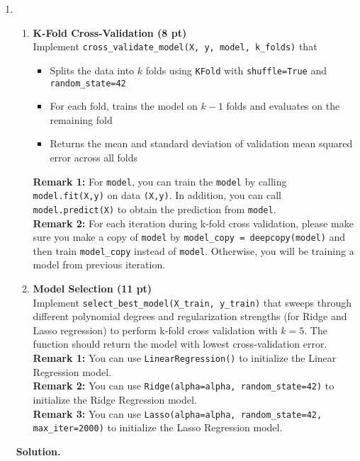 \documentclass{article}
\theoremstyle{definition}
\theoremstyle{remark}
\newenvironment{Q}
    {%
      \clearpage
      \item
    }
    {%
      \phantom{s}
      \bigskip
      \textbf{Solution.}
    }
\begin{document}
\begin{enumerate}[font={\Large\bfseries},left=0pt]
\begin{Q}
		\begin{enumerate}
			\item \textbf{K-Fold Cross-Validation (8 pt)}\\
			      Implement \texttt{cross\_validate\_model(X, y, model, k\_folds)} that
			      \begin{itemize}
				      \item Splits the data into $k$ folds using \texttt{KFold} with \texttt{shuffle=True} and \texttt{random\_state=42}
				      \item For each fold, trains the model on $k-1$ folds and evaluates on the remaining fold
				      \item Returns the mean and standard deviation of validation mean squared error across all folds
			      \end{itemize}
			      \textbf{Remark 1:} For \texttt{model}, you can train the \texttt{model} by calling \texttt{model.fit(X,y)} on data \texttt{(X,y)}. In addition, you can call \texttt{model.predict(X)} to obtain the prediction from \texttt{model}. \\
			      \textbf{Remark 2:} For each iteration during k-fold cross validation, please make sure you make a copy of \texttt{model} by \texttt{model\_copy = deepcopy(model)}  and then train \texttt{model\_copy} instead of \texttt{model}. Otherwise, you will be training a model from previous iteration.\\
			\item \textbf{Model Selection (11 pt)} \\
			      Implement \texttt{select\_best\_model(X\_train, y\_train)} that sweeps through different polynomial degrees and regularization strengths (for Ridge and Lasso regression) to perform k-fold cross validation with $k=5$. The function should return the model with lowest cross-validation error. \\
			      \textbf{Remark 1:} You can use \texttt{LinearRegression()} to initialize the Linear Regression model.\\
			      \textbf{Remark 2:} You can use \texttt{Ridge(alpha=alpha, random\_state=42)} to initialize the Ridge Regression model. \\
			      \textbf{Remark 3:} You can use \texttt{Lasso(alpha=alpha, random\_state=42, max\_iter=2000)} to initialize the Lasso Regression model. \\

		\end{enumerate}

	\end{Q}


\end{enumerate}
\end{document}
